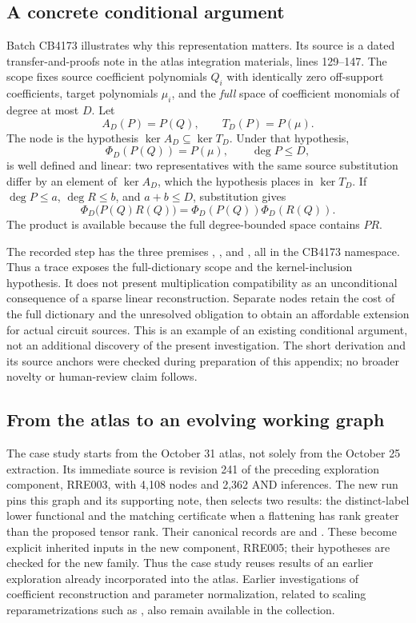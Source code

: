 \subsection{A concrete conditional argument}

Batch CB4173 illustrates why this representation matters. Its source is a dated transfer-and-proofs note in the atlas integration materials, lines 129--147. The scope fixes source coefficient polynomials $Q_i$ with identically zero off-support coefficients, target polynomials $\mu_i$, and the \emph{full} space of coefficient monomials of degree at most $D$. Let
\[
 A_D(P)=P(Q),\qquad T_D(P)=P(\mu).
\]
The node  is the hypothesis $\ker A_D\subseteq\ker T_D$. Under that hypothesis,
\[
 \Phi_D(P(Q))=P(\mu),\qquad \deg P\le D,
\]
is well defined and linear: two representatives with the same source substitution differ by an element of $\ker A_D$, which the hypothesis places in $\ker T_D$. If $\deg P\le a$, $\deg R\le b$, and $a+b\le D$, substitution gives
\[
 \Phi_D\bigl(P(Q)R(Q)\bigr)
   =\Phi_D(P(Q))\Phi_D(R(Q)).
\]
The product is available because the full degree-bounded space contains $PR$.

The recorded step  has the three premises , , and , all in the CB4173 namespace. Thus a trace exposes the full-dictionary scope and the kernel-inclusion hypothesis. It does not present multiplication compatibility as an unconditional consequence of a sparse linear reconstruction. Separate nodes retain the cost of the full dictionary and the unresolved obligation to obtain an affordable extension for actual circuit sources. This is an example of an existing conditional argument, not an additional discovery of the present investigation. The short derivation and its source anchors were checked during preparation of this appendix; no broader novelty or human-review claim follows.

\subsection{From the atlas to an evolving working graph}

The case study starts from the October 31 atlas, not solely from the October 25 extraction. Its immediate source is revision 241 of the preceding exploration component, RRE003, with 4,108 nodes and 2,362 AND inferences. The new run pins this graph and its supporting note, then selects two results: the distinct-label lower functional and the matching certificate when a flattening has rank greater than the proposed tensor rank. Their canonical records are  and . These become explicit inherited inputs in the new component, RRE005; their hypotheses are checked for the new family. Thus the case study reuses results of an earlier exploration already incorporated into the atlas. Earlier investigations of coefficient reconstruction and parameter normalization, related to scaling reparametrizations such as \cite{meshkat}, also remain available in the collection.

